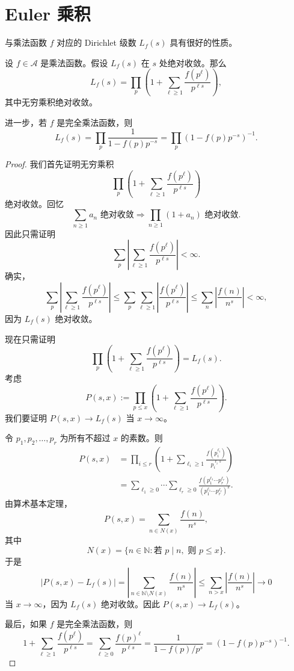 \section{Euler 乘积}

与乘法函数 $f$ 对应的 Dirichlet 级数 $L_f(s)$ 具有很好的性质。

\begin{theorem}[原文 Theorem 4.7]
	设 $f\in\mathcal A$ 是乘法函数。假设 $L_f(s)$ 在 $s$ 处绝对收敛。那么
	\[
		L_f(s)
		=
		\prod_p\left(1+\sum_{\ell\geq 1}\frac{f(p^\ell)}{p^{\ell s}}\right),
	\]
	其中无穷乘积绝对收敛。

	进一步，若 $f$ 是完全乘法函数，则
	\[
		L_f(s)
		=
		\prod_p\frac1{1-f(p)p^{-s}}
		=
		\prod_p(1-f(p)p^{-s})^{-1}.
	\]
\end{theorem}

\begin{proof}
	我们首先证明无穷乘积
	\[
		\prod_p\left(1+\sum_{\ell\geq 1}\frac{f(p^\ell)}{p^{\ell s}}\right)
	\]
	绝对收敛。回忆
	\[
		\sum_{n\geq 1}a_n\text{ 绝对收敛}
		\Longrightarrow
		\prod_{n\geq 1}(1+a_n)\text{ 绝对收敛}.
	\]
	因此只需证明
	\[
		\sum_p\left|\sum_{\ell\geq 1}\frac{f(p^\ell)}{p^{\ell s}}\right|<\infty.
	\]
	确实，
	\[
		\sum_p\left|\sum_{\ell\geq 1}\frac{f(p^\ell)}{p^{\ell s}}\right|
		\leq
		\sum_p\sum_{\ell\geq 1}\left|\frac{f(p^\ell)}{p^{\ell s}}\right|
		\leq
		\sum_n\left|\frac{f(n)}{n^s}\right|
		<\infty,
	\]
	因为 $L_f(s)$ 绝对收敛。

	现在只需证明
	\[
		\prod_p\left(1+\sum_{\ell\geq 1}\frac{f(p^\ell)}{p^{\ell s}}\right)
		=
		L_f(s).
	\]
	考虑
	\[
		P(s,x):=
		\prod_{p\leq x}\left(1+\sum_{\ell\geq 1}\frac{f(p^\ell)}{p^{\ell s}}\right).
	\]
	我们要证明 $P(s,x)\to L_f(s)$ 当 $x\to\infty$。

	令 $p_1,p_2,\ldots,p_r$ 为所有不超过 $x$ 的素数。则
	\[
	\begin{aligned}
		P(s,x)
		&=
		\prod_{i\leq r}
		\left(1+\sum_{\ell_i\geq 1}
		\frac{f(p_i^{\ell_i})}{p_i^{\ell_i s}}\right)\\
		&=
		\sum_{\ell_1\geq 0}\cdots\sum_{\ell_r\geq 0}
		\frac{f(p_1^{\ell_1}\cdots p_r^{\ell_r})}
		{(p_1^{\ell_1}\cdots p_r^{\ell_r})^s}.
	\end{aligned}
	\]
	由算术基本定理，
	\[
		P(s,x)=\sum_{n\in N(x)}\frac{f(n)}{n^s},
	\]
	其中
	\[
		N(x)=\{n\in\mathbb N:\text{若 }p\mid n,\text{ 则 }p\leq x\}.
	\]
	于是
	\[
		|P(s,x)-L_f(s)|
		=
		\left|
		\sum_{n\in\mathbb N\setminus N(x)}
		\frac{f(n)}{n^s}
		\right|
		\leq
		\sum_{n>x}\left|\frac{f(n)}{n^s}\right|
		\to 0
	\]
	当 $x\to\infty$，因为 $L_f(s)$ 绝对收敛。因此 $P(s,x)\to L_f(s)$。

	最后，如果 $f$ 是完全乘法函数，则
	\[
		1+\sum_{\ell\geq 1}\frac{f(p^\ell)}{p^{\ell s}}
		=
		\sum_{\ell\geq 0}\frac{f(p)^\ell}{p^{\ell s}}
		=
		\frac1{1-f(p)/p^s}
		=
		(1-f(p)p^{-s})^{-1}.
	\]
\end{proof}

